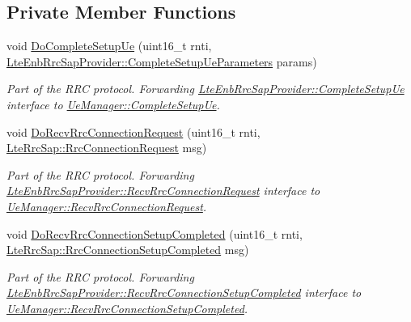 \subsection*{Private Member Functions}
\begin{DoxyCompactItemize}
\item 
void \hyperlink{classns3_1_1LteEnbRrc_a5ae8407cd2f557ebf8c610baf3653adf}{Do\+Complete\+Setup\+Ue} (uint16\+\_\+t rnti, \hyperlink{structns3_1_1LteEnbRrcSapProvider_1_1CompleteSetupUeParameters}{Lte\+Enb\+Rrc\+Sap\+Provider\+::\+Complete\+Setup\+Ue\+Parameters} params)
\begin{DoxyCompactList}\small\item\em Part of the R\+RC protocol. Forwarding \hyperlink{classns3_1_1LteEnbRrcSapProvider_acc43a1e7e8a4a6f5e6645066e9253060}{Lte\+Enb\+Rrc\+Sap\+Provider\+::\+Complete\+Setup\+Ue} interface to \hyperlink{classns3_1_1UeManager_a29ae16f2a383c0761f907de0973c56ee}{Ue\+Manager\+::\+Complete\+Setup\+Ue}. \end{DoxyCompactList}\item 
void \hyperlink{classns3_1_1LteEnbRrc_a1fd16795c1b18234a84a70c4881882f5}{Do\+Recv\+Rrc\+Connection\+Request} (uint16\+\_\+t rnti, \hyperlink{structns3_1_1LteRrcSap_1_1RrcConnectionRequest}{Lte\+Rrc\+Sap\+::\+Rrc\+Connection\+Request} msg)
\begin{DoxyCompactList}\small\item\em Part of the R\+RC protocol. Forwarding \hyperlink{classns3_1_1LteEnbRrcSapProvider_a6a49a245760fe748a1e959e92c9cc313}{Lte\+Enb\+Rrc\+Sap\+Provider\+::\+Recv\+Rrc\+Connection\+Request} interface to \hyperlink{classns3_1_1UeManager_af0959818ae542240ccf1caa2b3da19ab}{Ue\+Manager\+::\+Recv\+Rrc\+Connection\+Request}. \end{DoxyCompactList}\item 
void \hyperlink{classns3_1_1LteEnbRrc_acac9340fedd06f6be22233e20f62a7f0}{Do\+Recv\+Rrc\+Connection\+Setup\+Completed} (uint16\+\_\+t rnti, \hyperlink{structns3_1_1LteRrcSap_1_1RrcConnectionSetupCompleted}{Lte\+Rrc\+Sap\+::\+Rrc\+Connection\+Setup\+Completed} msg)
\begin{DoxyCompactList}\small\item\em Part of the R\+RC protocol. Forwarding \hyperlink{classns3_1_1LteEnbRrcSapProvider_aa167fea38bb3d88f6c87a4fbfbb2669e}{Lte\+Enb\+Rrc\+Sap\+Provider\+::\+Recv\+Rrc\+Connection\+Setup\+Completed} interface to \hyperlink{classns3_1_1UeManager_a603086a2beb1901cad3f30c6bfd32544}{Ue\+Manager\+::\+Recv\+Rrc\+Connection\+Setup\+Completed}. \end{DoxyCompactList}\item 

\end{DoxyCompactItemize}
